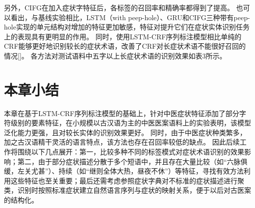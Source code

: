另外，CIFG在加入症状字特征后，各标签的召回率和精确率都得到了提高。
也可以看出，与基线实验相比，LSTM（with peep-hole）、GRU和CIFG三种带有peep-hole实现的单元结构对增加的特征更加敏感，特征对提升它们在症状实体识别任务上的表现具有更明显的作用。
同时，使用LSTM-CRF序列标注模型相比单纯的CRF能够更好地识别较长的症状术语，改善了CRF对长症状术语不能很好召回的情况[]。
各方法对测试语料中五字以上长症状术语的识别效果如表3所示。

\section{本章小结}
本章在基于LSTM-CRF序列标注模型的基础上，针对中医症状特征添加了部分字符级别的要素特征，在小规模以古汉语为主的中医医案语料上的实验表明，该模型泛化能力更强，且对较长实体的识别效果更好。
同时，由于中医症状种类繁多，加之古汉语精干灵活的语言特点，该方法也存在召回率较低的缺点。
因此后续工作将围绕以下几点展开：第一，比较多种不同的标签模式对症状术语识别的效果影响；第二，由于部分症状描述分散于多个短语中，并且存在大量比较（如“六脉俱缓，左关尤甚”）、持续（如“继则全体大热，昼夜不休”）等特征，寻找有效方法利用这些特征也至关重要；最后还需考虑参照症状字典对不标准的症状描述进行聚类，识别时按照标准症状建立自然语言序列与症状的映射关系，便于以后对古医案的结构化。



